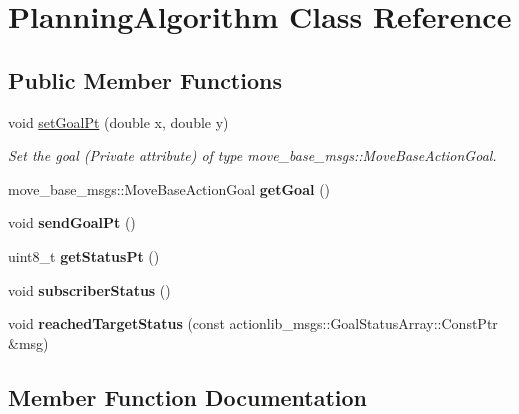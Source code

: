 \hypertarget{classPlanningAlgorithm}{}\section{Planning\+Algorithm Class Reference}
\label{classPlanningAlgorithm}
\subsection*{Public Member Functions}
\begin{DoxyCompactItemize}
\item 
void \hyperlink{classPlanningAlgorithm_a83451ad58a4bb8c051b2fbbfc323659a}{set\+Goal\+Pt} (double x, double y)
\begin{DoxyCompactList}\small\item\em Set the goal (Private attribute) of type move\+\_\+base\+\_\+msgs\+::\+Move\+Base\+Action\+Goal. \end{DoxyCompactList}\item 
move\+\_\+base\+\_\+msgs\+::\+Move\+Base\+Action\+Goal {\bfseries get\+Goal} ()\hypertarget{classPlanningAlgorithm_af74e93c0717cbdc2d02f621ec12988f9}{}\label{classPlanningAlgorithm_af74e93c0717cbdc2d02f621ec12988f9}

\item 
void {\bfseries send\+Goal\+Pt} ()\hypertarget{classPlanningAlgorithm_acd2424fa752f0082e0c28e9123d4b06c}{}\label{classPlanningAlgorithm_acd2424fa752f0082e0c28e9123d4b06c}

\item 
uint8\+\_\+t {\bfseries get\+Status\+Pt} ()\hypertarget{classPlanningAlgorithm_ab76116828d725d0d3a76bd8b8105baf5}{}\label{classPlanningAlgorithm_ab76116828d725d0d3a76bd8b8105baf5}

\item 
void {\bfseries subscriber\+Status} ()\hypertarget{classPlanningAlgorithm_aa6055f9530c8d0289cb4bfec7e298c9d}{}\label{classPlanningAlgorithm_aa6055f9530c8d0289cb4bfec7e298c9d}

\item 
void {\bfseries reached\+Target\+Status} (const actionlib\+\_\+msgs\+::\+Goal\+Status\+Array\+::\+Const\+Ptr \&msg)\hypertarget{classPlanningAlgorithm_a773c7f7b4eff9b3f2cbd14aafd26862f}{}\label{classPlanningAlgorithm_a773c7f7b4eff9b3f2cbd14aafd26862f}

\end{DoxyCompactItemize}


\subsection{Member Function Documentation}
